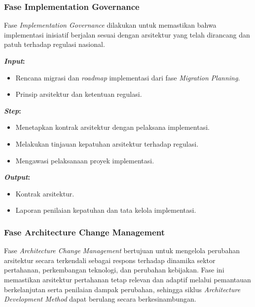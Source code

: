 \subsubsection{Fase Implementation Governance}
Fase \textit{Implementation Governance} dilakukan untuk memastikan bahwa implementasi inisiatif berjalan sesuai dengan arsitektur yang telah dirancang dan patuh terhadap regulasi nasional.

\textbf{\textit{Input}:}
\begin{itemize}
  \item Rencana migrasi dan \textit{roadmap} implementasi dari fase \textit{Migration Planning}.
  \item Prinsip arsitektur dan ketentuan regulasi.
\end{itemize}
\textbf{\textit{Step}:}
\begin{itemize}
  \item Menetapkan kontrak arsitektur dengan pelaksana implementasi.
  \item Melakukan tinjauan kepatuhan arsitektur terhadap regulasi.
  \item Mengawasi pelaksanaan proyek implementasi.
\end{itemize}
\textbf{\textit{Output}:}
\begin{itemize}
  \item Kontrak arsitektur.
  \item Laporan penilaian kepatuhan dan tata kelola implementasi.
\end{itemize}

\subsubsection{Fase Architecture Change Management}
Fase \textit{Architecture Change Management} bertujuan untuk mengelola perubahan arsitektur secara terkendali sebagai respons terhadap dinamika sektor pertahanan, perkembangan teknologi, dan perubahan kebijakan.
Fase ini memastikan arsitektur pertahanan tetap relevan dan adaptif melalui pemantauan berkelanjutan serta penilaian dampak perubahan, sehingga siklus \textit{Architecture Development Method} dapat berulang secara berkesinambungan.

